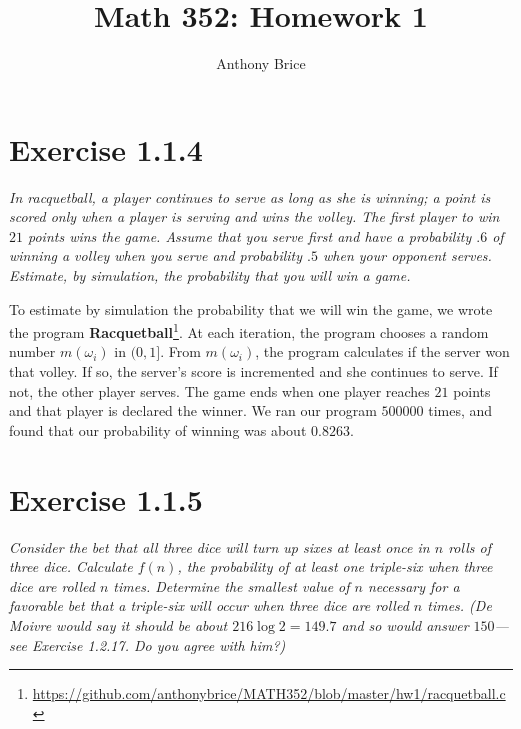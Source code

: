 \documentclass{tufte-handout}
\title{Math 352: Homework 1}
\author{Anthony Brice}
\begin{document}
\maketitle
\section{Exercise 1.1.4}

\begin{description}
\item \textit{In racquetball, a player continues to serve as long as
    she is winning; a point is scored only when a player is serving
    and wins the volley. The first player to win $21$ points wins the
    game. Assume that you serve first and have a probability $.6$ of
    winning a volley when you serve and probability $.5$ when your
    opponent serves. Estimate, by simulation, the probability that you
    will win a game.}
\end{description}

To estimate by simulation the probability that we will win the game,
we wrote the program \textbf{Racquetball}\footnote{
  \url{https://github.com/anthonybrice/MATH352/blob/master/hw1/racquetball.c}}.
At each iteration, the program chooses a random number $m(\omega_i)$
in $(0,1]$. From $m(\omega_i)$, the program calculates if the server
won that volley. If so, the server's score is incremented and she
continues to serve. If not, the other player serves. The game ends
when one player reaches $21$ points and that player is declared the
winner. We ran our program $500000$ times, and found that our
probability of winning was about $0.8263$.

\section{Exercise 1.1.5}

\begin{description}
\item \textit{Consider the bet that all three dice will turn up sixes
    at least once in $n$ rolls of three dice. Calculate $f(n)$, the
    probability of at least one triple-six when three dice are rolled
    $n$ times. Determine the smallest value of $n$ necessary for a
    favorable bet that a triple-six will occur when three dice are
    rolled $n$ times. (De Moivre would say it should be about $216
    \log 2 = 149.7$ and so would answer $150$---see Exercise
    1.2.17. Do you agree with him?)}
\end{description}
\end{document}
